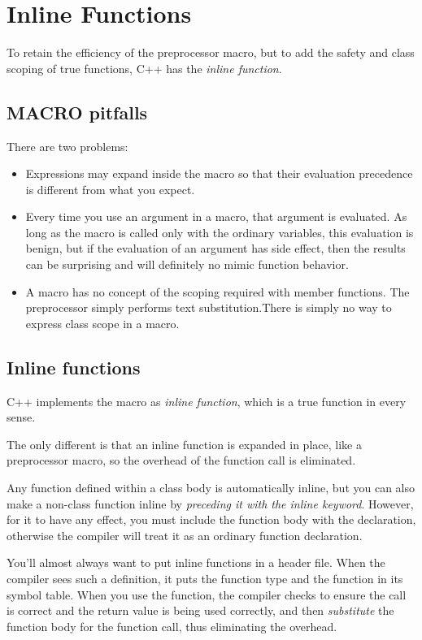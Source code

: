 \documentclass[11pt, a4paper]{book}
\begin{document}
\chapter{Inline Functions}
To retain the efficiency of the preprocessor macro, but to add the safety and
class scoping of true functions, C++ has the \emph{inline function}. 
\section{MACRO pitfalls}
There are two problems:
\begin{itemize}
\item Expressions may expand inside the macro so that their evaluation
precedence is different from what you expect.
\item Every time you use an argument in a macro, that argument is evaluated. As
long as the macro is called only with the ordinary variables, this evaluation is
benign, but if the evaluation of an argument has side effect, then the results
can be surprising and will definitely no mimic function behavior.
\item A macro has no concept of the scoping required with member functions. The
preprocessor simply performs text substitution.There is simply no way to express
class scope in a macro.
\end{itemize}
\section{Inline functions}
C++ implements the macro as \emph{inline function}, which is a true function in
every sense.

The only different is that an inline function is expanded in place, like a
preprocessor macro, so the overhead of the function call is eliminated.

Any function defined within a class body is automatically inline, but you can
also make a non-class function inline by \emph{preceding it with the inline
keyword}. However, for it to have any effect, you must include the function body
with the declaration, otherwise the compiler will treat it as an ordinary
function declaration.

You'll almost always want to put inline functions in a header file. When the
compiler sees such a definition, it puts the function type and the function in
its symbol table. When you use the function, the compiler checks to ensure the
call is correct and the return value is being used correctly, and then
\emph{substitute} the function body for the function call, thus eliminating the
overhead.
\end{document}
